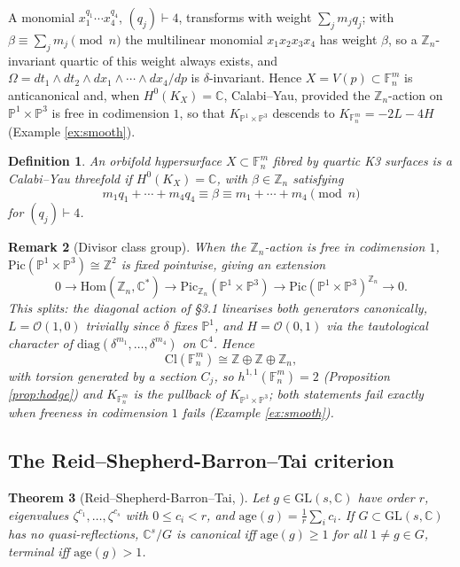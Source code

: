 \documentclass[11pt]{article}
\newtheorem{theorem}{Theorem}[section]
\newtheorem{definition}[theorem]{Definition}
\newtheorem{remark}[theorem]{Remark}
\newcommand{\PP}{\mathbb{P}}
\newcommand{\ZZ}{\mathbb{Z}}
\newcommand{\CC}{\mathbb{C}}
\newcommand{\F}{\mathbb{F}}
\begin{document}
	A monomial $x_1^{q_1}\cdots x_4^{q_4}$, $(q_j)\vdash4$, transforms with weight $\sum_j m_jq_j$; with $\beta\equiv\sum_j m_j\pmod n$ the multilinear monomial $x_1x_2x_3x_4$ has weight $\beta$, so a $\ZZ_n$-invariant quartic of this weight always exists, and $\Omega=dt_1\wedge dt_2\wedge dx_1\wedge\cdots\wedge dx_4/dp$ is $\delta$-invariant. Hence $X=V(p)\subset\mathbb{F}^m_n$ is anticanonical and, when $H^0(K_X)=\CC$, Calabi--Yau, provided the $\ZZ_n$-action on $\PP^1\times\PP^3$ is free in codimension $1$, so that $K_{\PP^1\times\PP^3}$ descends to $K_{\F^m_n}=-2L-4H$ (Example \ref{ex:smooth}).
	
	\begin{definition}\label{def:CY}
		An orbifold hypersurface $X\subset\F^m_n$ fibred by quartic K3 surfaces is a \emph{Calabi--Yau threefold} if $H^0(K_X)=\CC$, with $\beta\in\ZZ_n$ satisfying
		\[
		m_1q_1+\cdots+m_4q_4\equiv\beta\equiv m_1+\cdots+m_4\pmod n
		\]
		for $(q_j)\vdash4$.
	\end{definition}
	
	\begin{remark}[Divisor class group]\label{rem:clgroup}
		When the $\ZZ_n$-action is free in codimension $1$, $\mathrm{Pic}(\PP^1\times\PP^3)\cong\ZZ^2$ is fixed pointwise, giving an extension
		\[
		0\to\mathrm{Hom}(\ZZ_n,\CC^*)\to\mathrm{Pic}_{\ZZ_n}(\PP^1\times\PP^3)\to\mathrm{Pic}(\PP^1\times\PP^3)^{\ZZ_n}\to0.
		\]
		This splits: the diagonal action of \S3.1 linearises both generators canonically, $L=\mathcal O(1,0)$ trivially since $\delta$ fixes $\PP^1$, and $H=\mathcal O(0,1)$ via the tautological character of $\mathrm{diag}(\delta^{m_1},\dots,\delta^{m_4})$ on $\CC^4$. Hence
		\[
		\mathrm{Cl}(\F^m_n)\cong\ZZ\oplus\ZZ\oplus\ZZ_n,
		\]
		with torsion generated by a section $C_j$, so $h^{1,1}(\F^m_n)=2$ (Proposition \ref{prop:hodge}) and $K_{\F^m_n}$ is the pullback of $K_{\PP^1\times\PP^3}$; both statements fail exactly when freeness in codimension $1$ fails (Example \ref{ex:smooth}).
	\end{remark}
	
	\subsection{The Reid--Shepherd-Barron--Tai criterion}
	
	\begin{theorem}[Reid--Shepherd-Barron--Tai, \cite{Reid1980,Reid1985,Tai1982}]\label{thm:RSBT}
		Let $g\in\mathrm{GL}(s,\CC)$ have order $r$, eigenvalues $\zeta^{c_1},\dots,\zeta^{c_s}$ with $0\le c_i<r$, and $\mathrm{age}(g)=\frac1r\sum_ic_i$. If $G\subset\mathrm{GL}(s,\CC)$ has no quasi-reflections, $\CC^s/G$ is canonical iff $\mathrm{age}(g)\ge1$ for all $1\ne g\in G$, terminal iff $\mathrm{age}(g)>1$.
	\end{theorem}
	
\end{document}
